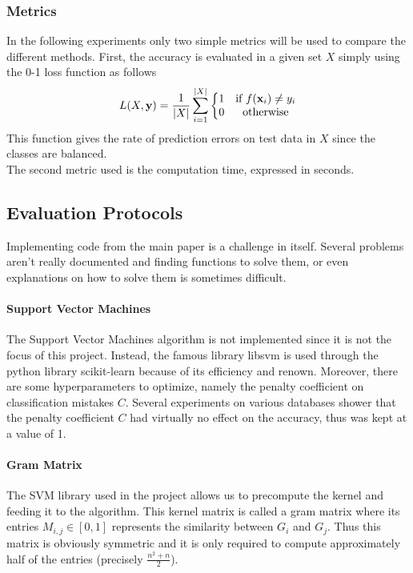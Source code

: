 \documentclass{article}
\DeclarePairedDelimiter{\abs}{\lvert}{\rvert}
\let\vec\mathbf
\theoremstyle{definition}
\begin{document}
\subsubsection{Metrics}
In the following experiments only two simple metrics will be used to compare the different methods. First, the accuracy is evaluated in a given set $X$ simply using the 0-1 loss function as follows
\begin{equation}
L(X,\vec{y})=\frac{1}{\abs{X}}\sum\limits_{i=1}^{\abs{X}}\left\{
\begin{matrix}
1 & \mbox{if } f(\vec{x}_i) \neq y_i \\
0 & \mbox{otherwise}
\end{matrix}
\right.
\end{equation}
This function gives the rate of prediction errors on test data in $X$ since the classes are balanced.\\
The second metric used is the computation time, expressed in seconds. 
\subsection{Evaluation Protocols}
Implementing code from the main paper is a challenge in itself. Several problems aren't really documented and finding functions to solve them, or even explanations on how to solve them is sometimes difficult.
\paragraph{Support Vector Machines}
The Support Vector Machines algorithm is not implemented since it is not the focus of this project. Instead, the famous library libsvm\cite{cc2011libsvm} is used through the python library scikit-learn\cite{pedregosa2011scikit} because of its efficiency and renown. Moreover, there are some hyperparameters to optimize, namely the penalty coefficient on classification mistakes $C$. Several experiments on various databases shower that the penalty coefficient $C$ had virtually no effect on the accuracy, thus was kept at a value of 1.
\paragraph{Gram Matrix}
The SVM library used in the project allows us to precompute the kernel and feeding it to the algorithm. This kernel matrix is called a gram matrix where its entries $M_{i,j}\in [0,1]$ represents the similarity between $G_i$ and $G_j$. Thus this matrix is obviously symmetric and it is only required to compute approximately half of the entries (precisely $\frac{n^2+n}{2}$).
\end{document}
